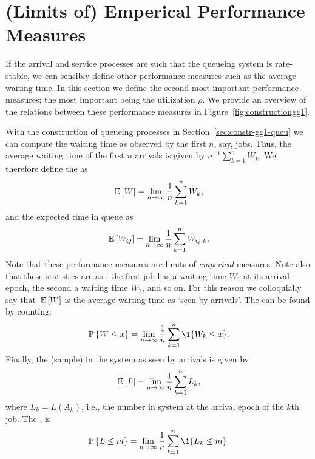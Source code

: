 \section{(Limits of) Emperical Performance Measures}
\label{sec:limits-of-emperical}

If the arrival and service processes are such that the queueing system
is rate-stable, we can sensibly define other performance measures such
as the average waiting time. In this section we define the second most
important performance measures; the most important being the
utilization $\rho$. We provide an overview of the relations between
these performance measures in Figure~\ref{fig:constructiongg1}.


With the construction of queueing processes in
Section~\ref{sec:constr-gg1-queu} we can compute the waiting time as
observed by the first $n$, say, jobs. Thus, the average waiting time
of the first $n$ arrivals is given by $n^{-1}\sum_{k=1}^n W_k$. We
therefore define the  as
\begin{equation}\label{eq:49}
  \,\mathbb{E}\left[W\right] = \lim_{n\to\infty} \frac 1n\sum_{k=1}^n W_k,
\end{equation}
and the expected time in queue as
\begin{equation}\label{eq:50}
  \,\mathbb{E}\left[W_Q\right] = \lim_{n\to\infty} \frac 1 n\sum_{k=1}^n W_{Q,k}.
\end{equation}
Note that these performance measures are limits of \emph{emperical}
measures.  Note also that these statistics are as : the first job has a waiting time $W_1$ at its
arrival epoch, the second a waiting time $W_2$, and so on. For this
reason we colloquially say that $\,\mathbb{E}\left[W\right]$ is the average waiting time as
`seen by arrivals'.  The  can be found by counting:
\begin{equation}\label{eq:48}
  \P{W \leq x}  = \lim_{n\to\infty} \frac 1n\sum_{k=1}^n \1{W_k\leq x}.
\end{equation}
Finally, the (sample)  in the system as seen by
arrivals is given by
\begin{equation}\label{eq:EQ}
\,\mathbb{E}\left[L\right] =  \lim_{n\to\infty}\frac 1 n \sum_{k=1}^n L_k,
\end{equation}
where $L_k = L(A_k)$, i.e., the number in system at the arrival epoch
of the $k$th job.  The , is
\begin{equation}\label{eq:Qm}
\P{L\leq m} = \lim_{n\to\infty} \frac 1 n \sum_{k=1}^n \1{L_k \leq m}.
\end{equation}



